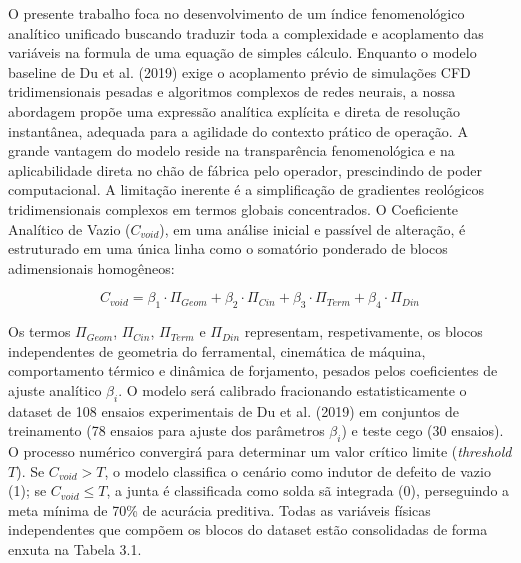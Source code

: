 \documentclass[12pt,openany]{report}
\begin{document}
O presente trabalho foca no desenvolvimento de um índice fenomenológico analítico unificado buscando traduzir toda a complexidade e acoplamento das variáveis na formula de uma equação de simples cálculo. Enquanto o modelo baseline de Du et al. (2019) exige o acoplamento prévio de simulações CFD tridimensionais pesadas e algoritmos complexos de redes neurais, a nossa abordagem propõe uma expressão analítica explícita e direta de resolução instantânea, adequada para a agilidade do contexto prático de operação. A grande vantagem do modelo reside na transparência fenomenológica e na aplicabilidade direta no chão de fábrica pelo operador, prescindindo de poder computacional. A limitação inerente é a simplificação de gradientes reológicos tridimensionais complexos em termos globais concentrados. O Coeficiente Analítico de Vazio ($C_{void}$), em uma análise inicial e passível de alteração, é estruturado em uma única linha como o somatório ponderado de blocos adimensionais homogêneos:

\begin{equation}
C_{void} = \beta_{1} \cdot \Pi_{Geom} + \beta_{2} \cdot \Pi_{Cin} + \beta_{3} \cdot \Pi_{Term} + \beta_{4} \cdot \Pi_{Din} \tag{3.1}
\end{equation}

Os termos $\Pi_{Geom}$, $\Pi_{Cin}$, $\Pi_{Term}$ e $\Pi_{Din}$ representam, respetivamente, os blocos independentes de geometria do ferramental, cinemática de máquina, comportamento térmico e dinâmica de forjamento, pesados pelos coeficientes de ajuste analítico $\beta_i$. O modelo será calibrado fracionando estatisticamente o dataset de 108 ensaios experimentais de Du et al. (2019) em conjuntos de treinamento (78 ensaios para ajuste dos parâmetros $\beta_i$) e teste cego (30 ensaios). O processo numérico convergirá para determinar um valor crítico limite (\textit{threshold} $T$). Se $C_{void} > T$, o modelo classifica o cenário como indutor de defeito de vazio (1); se $C_{void} \le T$, a junta é classificada como solda sã integrada (0), perseguindo a meta mínima de 70\% de acurácia preditiva. Todas as variáveis físicas independentes que compõem os blocos do dataset estão consolidadas de forma enxuta na Tabela 3.1.
\end{document}

